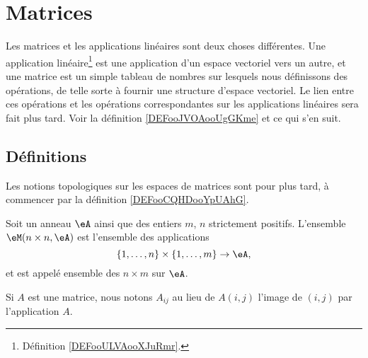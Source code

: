 \section{Matrices}

Les matrices et les applications linéaires sont deux choses différentes. Une application linéaire\footnote{Définition \ref{DEFooULVAooXJuRmr}.} est une application d'un espace vectoriel vers un autre, et une matrice est un simple tableau de nombres sur lesquels nous définissons des opérations, de telle sorte à fournir une structure d'espace vectoriel. Le lien entre ces opérations et les opérations correspondantes sur les applications linéaires sera fait plus tard. Voir la définition \ref{DEFooJVOAooUgGKme} et ce qui s'en suit.


\subsection{Définitions}

Les notions topologiques sur les espaces de matrices sont pour plus tard, à commencer par la définition \ref{DEFooCQHDooYpUAhG}.

\begin{definition}
    Soit un anneau \( \eA\) ainsi que des entiers \( m\), \( n\) strictement positifs. L'ensemble \( \eM(n\times n,\eA)\) est l'ensemble des applications
    \begin{equation}
        \{ 1,\ldots, n \}\times \{ 1,\ldots, m \}\to \eA,
    \end{equation}
    et est appelé ensemble des  \(n\times m\) sur \( \eA \).
\end{definition}
Si \( A\) est une matrice, nous notons \( A_{ij}\) au lieu de \( A(i,j)\) l'image de \( (i,j)\) par l'application \( A\).


